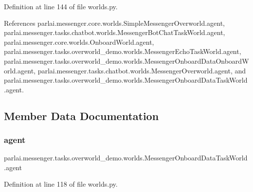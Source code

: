 Definition at line 144 of file worlds.\+py.



References parlai.\+messenger.\+core.\+worlds.\+Simple\+Messenger\+Overworld.\+agent, parlai.\+messenger.\+tasks.\+chatbot.\+worlds.\+Messenger\+Bot\+Chat\+Task\+World.\+agent, parlai.\+messenger.\+core.\+worlds.\+Onboard\+World.\+agent, parlai.\+messenger.\+tasks.\+overworld\+\_\+demo.\+worlds.\+Messenger\+Echo\+Task\+World.\+agent, parlai.\+messenger.\+tasks.\+overworld\+\_\+demo.\+worlds.\+Messenger\+Onboard\+Data\+Onboard\+World.\+agent, parlai.\+messenger.\+tasks.\+chatbot.\+worlds.\+Messenger\+Overworld.\+agent, and parlai.\+messenger.\+tasks.\+overworld\+\_\+demo.\+worlds.\+Messenger\+Onboard\+Data\+Task\+World.\+agent.



\subsection{Member Data Documentation}
\mbox{\label{classparlai_1_1messenger_1_1tasks_1_1overworld__demo_1_1worlds_1_1MessengerOnboardDataTaskWorld_ad672682e5ac0f0a58cd0387c020e13fb}} 
\subsubsection{\texorpdfstring{agent}{agent}}
{\footnotesize\ttfamily parlai.\+messenger.\+tasks.\+overworld\+\_\+demo.\+worlds.\+Messenger\+Onboard\+Data\+Task\+World.\+agent}



Definition at line 118 of file worlds.\+py.



